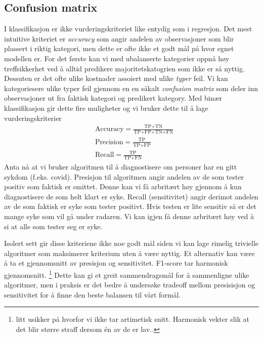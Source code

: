 \subsection{Confusion matrix}
I klassifikasjon er ikke vurderingskriteriet like entydig som i regresjon. Det mest intuitive kriteriet er \textit{accuracy} som angir andelen av observasjoner som blir plassert i riktig kategori, men dette er ofte ikke et godt mål på hvor egnet modellen er. For det første kan vi med ubalanserte kategorier oppnå høy treffsikkerhet ved å alltid predikere majoritetskatogrien som ikke er så nyttig. Dessuten er det ofte ulike kostnader assoiert med ulike \textit{typer} feil. Vi kan kategoriesere ulike typer feil gjennom en en såkalt \textit{confusion matrix} som deler inn observasjoner ut fra faktisk kategori og predikert kategory. Med binær klassifikasjon gir dette fire muligheter og vi bruker dette til å lage vurderingskriterier
\begin{align}
&\text{Accuracy} = \frac{\text{TP+TN}}{\text{TP+FP+TN+FN}}\\[1ex]
&\text{Precision} = \frac{\text{TP}}{\text{TP} + \text{FP}}\\[1ex]
&\text{Recall} = \frac{\text{TP}}{\text{TP} + \text{FN}}
\end{align}
Anta nå at vi bruker algoritmen til å diagnostisere om personer har en gitt sykdom (f.eks. covid). Presisjon til algoritmen angir andelen av de som tester positiv som faktisk er smittet. Denne kan vi få arbritært høy gjennom å kun diagnostisere de som helt klart er syke. Recall (sensitivitet) angir derimot andelen av de som faktisk er syke som tester positivt. Hvis testen er lite sensitiv så er det mange syke som vil gå under radaren. Vi kan igjen få denne arbritært høy ved å si at alle som tester seg er syke. 

Isolert sett gir disse kriteriene ikke noe godt mål siden vi kan lage rimelig trivielle algoritmer som maksimerer kriterium uten å være nyttig. Et alternativ kan være å ta et gjennomsnitt av presisjon og sensitivitet. F1-score tar harmonisk gjennomsnitt. \footnote{litt usikker på hvorfor vi ikke tar artimetisk snitt. Harmonisk vekter slik at det blir større straff dersom én av de er lav..} Dette kan gi et greit sammendragsmål for å sammenligne ulike algoritmer, men i praksis er det bedre å undersøke tradeoff mellom presisisjon og sensitivitet for å finne den beste balansen til vårt formål.
